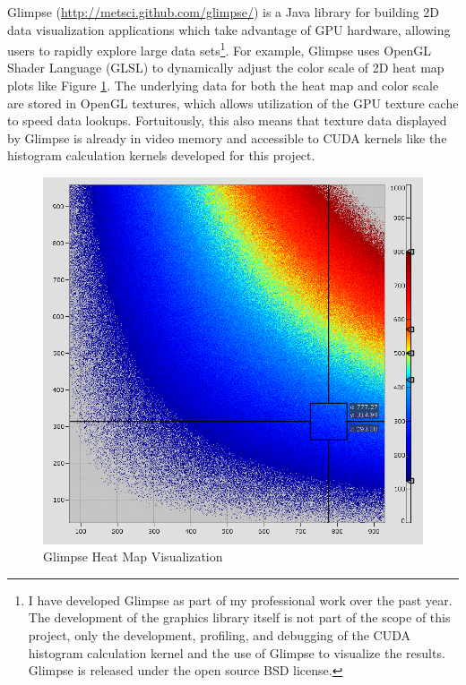 \documentclass{article}
\begin{document}
Glimpse (\url{http://metsci.github.com/glimpse/}) is a Java library for building 2D data visualization applications which take advantage of GPU hardware, allowing users to rapidly explore large data sets\footnote{I have developed Glimpse as part of my professional work over the past year. The development of the graphics library itself is not part of the scope of this project, only the development, profiling, and debugging of the CUDA histogram calculation kernel and the use of Glimpse to visualize the results. Glimpse is released under the open source BSD license.}. For example, Glimpse uses OpenGL Shader Language (GLSL) to dynamically adjust the color scale of 2D heat map plots like Figure \ref{heatmap}. The underlying data for both the heat map and color scale are stored in OpenGL textures, which allows utilization of the GPU texture cache to speed data lookups. Fortuitously, this also means that texture data displayed by Glimpse is already in video memory and accessible to CUDA kernels like the histogram calculation kernels developed for this project.

\begin{figure}
\centering
\includegraphics[width=1.0\textwidth]{screenshots/glimpse/TaggedHeatMapExample.png}
\caption{Glimpse Heat Map Visualization\cite{glimpse.com}}
\label{heatmap}
\end{figure}
\end{document}

